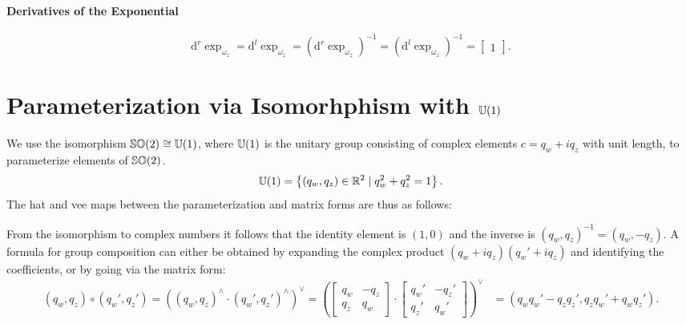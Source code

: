 \begin{properties}[breakable, title={$\SOtwo$ formula sheet}]
  \paragraph{Derivatives of the Exponential}
  \begin{equation}
    \mathrm{d}^r \exp_{\omega_z} =
    \mathrm{d}^l \exp_{\omega_z} =
    \left( \mathrm{d}^r \exp_{\omega_z} \right)^{-1} =
    \left( \mathrm{d}^l \exp_{\omega_z} \right)^{-1} = \begin{bmatrix} 1 \end{bmatrix}.
  \end{equation}
\end{properties}

\section{Parameterization via Isomorhphism with ${\mathbb{U}(1)}$}

We use the isomorphism ${\mathbb{SO}(2)} \cong {\mathbb{U}(1)}$, where ${\mathbb{U}(1)}$ is the unitary group consisting of complex elements $c = q_{w} + i q_{z}$ with unit length, to parameterize elements of $\SOtwo$.
\begin{equation}
  {\mathbb{U}(1)} = \left\{ (q_w, q_z) \in \mathbb{R}^{2} \mid q_w^2 + q_z^2 = 1 \right\}.
\end{equation}
The hat and vee maps between the parameterization and matrix forms are thus as follows:
\begin{center}
\end{center}

From the isomorphism to complex numbers it follows that the identity element is $(1, 0)$ and the inverse is
$(q_w, q_z)^{-1} = (q_w, -q_z)$. A formula for group composition can either be obtained by expanding the complex product $(q_{w} + i q_{z}) (q_{w}' + i q_{z})$ and identifying the coefficients, or by going via the matrix form:
\begin{equation*}
  \begin{aligned}
    (q_w, q_z) \circ (q_w', q_z') = \left( (q_w, q_z)^\wedge \cdot (q_w', q_z')^\wedge \right)^\vee = \left( \begin{bmatrix}
      q_w & -q_z \\ q_z & q_w
    \end{bmatrix} \cdot \begin{bmatrix}
      q_w' & -q_z' \\ q_z' & q_w'
    \end{bmatrix}  \right)^\vee & = (q_w q_w' - q_z q_z', q_z q_w' + q_w q_z').
  \end{aligned}
\end{equation*}

